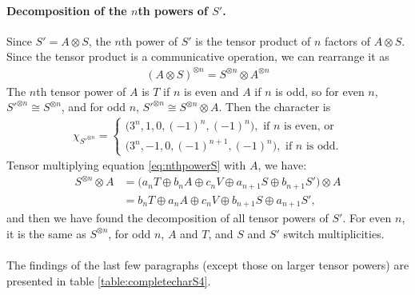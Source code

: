 \paragraph{Decomposition of the $n$th powers of $S'$.} Since $S' = A \otimes S$, the $n$th power of $S'$ is the tensor product of $n$ factors of $A \otimes S$. Since the tensor product is a communicative operation, we can rearrange it as
\begin{align}
	(A \otimes S)^{\otimes n} = S^{\otimes n} \otimes A^{\otimes n}
\end{align}
The $n$th tensor power of $A$ is $T$ if $n$ is even and $A$ if $n$ is odd, so for even $n$, $S'^{\otimes n} \cong S^{\otimes n}$, and for odd $n$, $S'^{\otimes n} \cong S^{\otimes n} \otimes A$. Then the character is 
\begin{align}
	\chi_{S'^{\otimes n}} = \begin{cases}
		\big(3^n,1,0,(-1)^{n}, (-1)^n\big), \text{ if } n \text{ is even, or} \\
		\big(3^n,-1,0,(-1)^{n+1}, (-1)^n\big), \text{ if } n \text{ is odd.}
	\end{cases}
\end{align}
Tensor multiplying equation \ref{eq:nthpowerS} with $A$, we have:
\begin{align}
	S^{\otimes n} \otimes A &= \Big(a_n T \oplus b_n A \oplus c_n V \oplus a_{n+1} S \oplus b_{n+1} S'\Big)\otimes A \\
	&= b_n T \oplus a_n A \oplus c_n V \oplus b_{n+1} S \oplus a_{n+1} S',
\end{align}
and then we have found the decomposition of all tensor powers of $S'$. For even $n$, it is the same as $S^{\otimes n}$, for odd $n$, $A$ and $T$, and $S$ and $S'$ switch multiplicities.

\paragraph{} The findings of the last few paragraphs (except those on larger tensor powers) are presented in table \ref{table:completecharS4}.

